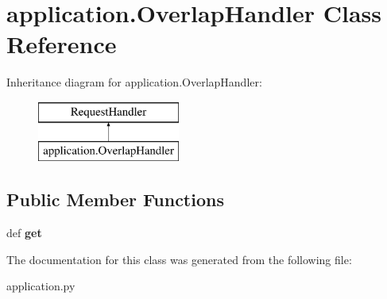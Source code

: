 \hypertarget{classapplication_1_1_overlap_handler}{\section{application.\-Overlap\-Handler Class Reference}
\label{classapplication_1_1_overlap_handler}
}
Inheritance diagram for application.\-Overlap\-Handler\-:\begin{figure}[H]
\begin{center}
\leavevmode
\includegraphics[height=2.000000cm]{classapplication_1_1_overlap_handler}
\end{center}
\end{figure}
\subsection*{Public Member Functions}
\begin{DoxyCompactItemize}
\item 
\hypertarget{classapplication_1_1_overlap_handler_a67ccb08d9c3d516e7d97af9025032e6b}{def {\bfseries get}}\label{classapplication_1_1_overlap_handler_a67ccb08d9c3d516e7d97af9025032e6b}

\end{DoxyCompactItemize}


The documentation for this class was generated from the following file\-:\begin{DoxyCompactItemize}
\item 
application.\-py\end{DoxyCompactItemize}
